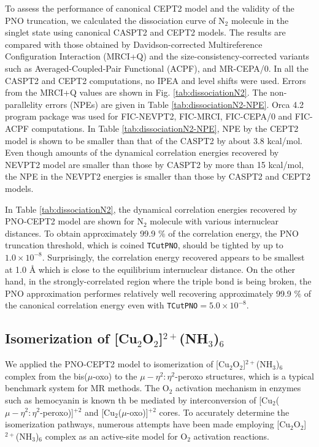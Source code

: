 \documentclass[aip,jcp,amsmath]{revtex4-1}
\begin{document}
%
To assess the performance of canonical CEPT2 model and the validity of the PNO truncation, we calculated the dissociation curve of N${}_2$ molecule in the singlet state using canonical CASPT2 and CEPT2 models.
%
The results are compared with those obtained by Davidson-corrected Multireference Configuration Interaction (MRCI+Q) and the size-consistency-corrected variants such as Averaged-Coupled-Pair Functional (ACPF), and MR-CEPA/0.
%
In all the CASPT2 and CEPT2 computations, no IPEA and level shifts were used.
%
Errors from the MRCI+Q values are shown in Fig. \ref{tab:dissociationN2}.
%
The non-parallelity errors (NPEs) are given in Table \ref{tab:dissociationN2-NPE}.
%
Orca 4.2 program package\cite{WCMS:WCMS1327} was used for FIC-NEVPT2,\cite{angelin-electron2002} FIC-MRCI,\cite{doi:10.1063/1.4959029} FIC-CEPA/0 and FIC-ACPF\cite{Gdanitz1988} computations.
%
In Table \ref{tab:dissociationN2-NPE}, NPE by the CEPT2 model is shown to be smaller than that of the CASPT2 by about 3.8 kcal/mol.
%
Even though amounts of the dynamical correlation energies recovered by NEVPT2 model are smaller than those by CASPT2 by more than 15 kcal/mol, the NPE in the NEVPT2 energies is smaller than those by CASPT2 and CEPT2 models.

%
In Table \ref{tab:dissociationN2}, the dynamical correlation energies recovered by PNO-CEPT2 model are shown for N${}_2$ molecule with various internuclear distances.
%
To obtain approximately 99.9 $\%$ of the correlation energy, the PNO truncation threshold, which is coined {\tt TCutPNO}, should be tighted by up to $1.0\times 10^{-8}$.
%
Surprisingly, the correlation energy recovered appears to be smallest at 1.0 {\AA} which is close to the equilibrium internuclear distance.
%
On the other hand, in the strongly-correlated region where the triple bond is being broken, the PNO approximation performes relatively well recovering approximately 99.9 $\%$ of the canonical correlation energy even with {\tt TCutPNO}$=5.0\times 10^{-8}$.

\subsection{Isomerization of [Cu${}_2$O${}_2$]${}^{2+}$(NH${}_3$)${}_{6}$}

%
We applied the PNO-CEPT2 model to isomerization of [Cu${}_2$O${}_2$]${}^{2+}$(NH${}_3$)${}_{6}$ complex from the bis($\mu$-oxo) to the $\mu-\eta^2:\eta^2$-peroxo structures, which is a typical benchmark system for MR methods.\cite{Rode2005,AK74,doi:10.1063/1.4900878}
%
The O${}_2$ activation mechanism in enzymes such as hemocyanin is known th be mediated by interconversion of [Cu${}_2$($\mu-\eta^2:\eta^2$-peroxo)]${}^{+2}$ and [Cu${}_2$($\mu$-oxo)]${}^{+2}$ cores.
%
To accurately determine the isomerization pathways, numerous attempts have been made employing [Cu${}_2$O${}_2$]${}^{2+}$(NH${}_3$)${}_{6}$ complex as an active-site model for O${}_2$ activation reactions.
\end{document}

